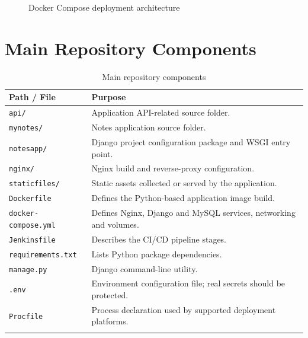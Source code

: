 \documentclass[12pt,a4paper,oneside]{report}
\begin{document}
\begin{figure}[H]
\centering
{}
\caption{Docker Compose deployment architecture}
\label{fig:compose}
\end{figure}

\section{Main Repository Components}
\begin{longtable}{|p{}|p{}|}
\hline
\textbf{Path / File} & \textbf{Purpose}\\ \hline
\texttt{api/} & Application API-related source folder.\\ \hline
\texttt{mynotes/} & Notes application source folder.\\ \hline
\texttt{notesapp/} & Django project configuration package and WSGI entry point.\\ \hline
\texttt{nginx/} & Nginx build and reverse-proxy configuration.\\ \hline
\texttt{staticfiles/} & Static assets collected or served by the application.\\ \hline
\texttt{Dockerfile} & Defines the Python-based application image build.\\ \hline
\texttt{docker-compose.yml} & Defines Nginx, Django and MySQL services, networking and volumes.\\ \hline
\texttt{Jenkinsfile} & Describes the CI/CD pipeline stages.\\ \hline
\texttt{requirements.txt} & Lists Python package dependencies.\\ \hline
\texttt{manage.py} & Django command-line utility.\\ \hline
\texttt{.env} & Environment configuration file; real secrets should be protected.\\ \hline
\texttt{Procfile} & Process declaration used by supported deployment platforms.\\ \hline
\caption{Main repository components}
\label{tab:repo}
\end{longtable}
\end{document}
